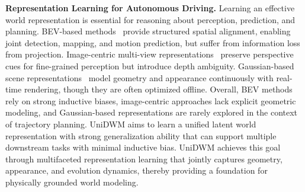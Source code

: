 \noindent\textbf{Representation Learning for Autonomous Driving.}
Learning an effective world representation is essential for reasoning about perception, prediction, and planning. BEV-based methods~\cite{li2024bevformer, liang2022bevfusion, jia2023think} provide structured spatial alignment, enabling joint detection, mapping, and motion prediction, but suffer from information loss from projection. Image-centric multi-view representations~\cite{wang2022detr3d, liu2022petr, jia2025drivetransformer} preserve perspective cues for fine-grained perception but introduce depth ambiguity. Gaussian-based scene representations~\cite{3dgs, kerbl2024hierarchical, huang2024gaussianformer, liu2025gaussianfusion} model geometry and appearance continuously with real-time rendering, though they are often optimized offline. Overall, BEV methods rely on strong inductive biases, image-centric approaches lack explicit geometric modeling, and Gaussian-based representations are rarely explored in the context of trajectory planning. UniDWM aims to learn a unified latent world representation with strong generalization ability that can support multiple downstream tasks with minimal inductive bias. UniDWM achieves this goal through multifaceted representation learning that jointly captures geometry, appearance, and evolution dynamics, thereby providing a foundation for physically grounded world modeling.
